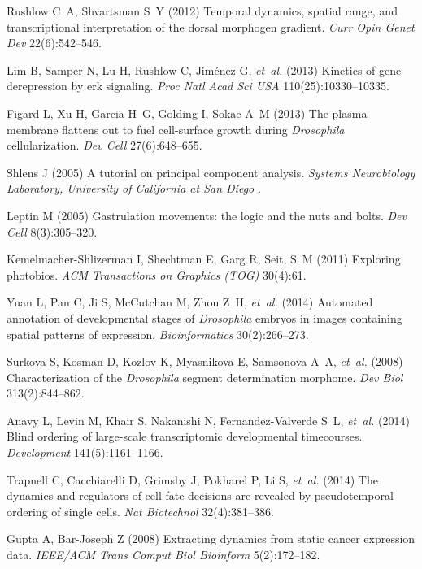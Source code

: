 \documentclass{pnastwo}
\begin{document}
\begin{article}
\begin{thebibliography}{10}
Rushlow C~A, Shvartsman S~Y (2012) Temporal dynamics, spatial range, and
  transcriptional interpretation of the dorsal morphogen gradient.
  \textit{Curr Opin Genet Dev} 22(6):542--546.

Lim B, Samper N, Lu H, Rushlow C, Jim{\'e}nez G, \textit{et~al.} (2013)
  Kinetics of gene derepression by erk signaling. \textit{Proc Natl Acad Sci USA} 110(25):10330--10335.

Figard L, Xu H, Garcia H~G, Golding I, Sokac A~M (2013) The plasma membrane
  flattens out to fuel cell-surface growth during \textit{{D}rosophila}
  cellularization. \textit{Dev Cell} 27(6):648--655.

Shlens J (2005) A tutorial on principal component analysis. \textit{Systems
  Neurobiology Laboratory, University of California at San Diego} .

Leptin M (2005) Gastrulation movements: the logic and the nuts and bolts.
  \textit{Dev Cell} 8(3):305--320.

Kemelmacher-Shlizerman I, Shechtman E, Garg R, Seit, S~M (2011)
Exploring photobios. \textit{ACM Transactions on Graphics (TOG)} 30(4):61.

Yuan L, Pan C, Ji S, McCutchan M, Zhou Z~H, \textit{et~al.} (2014) Automated
  annotation of developmental stages of \textit{{D}rosophila} embryos in images
  containing spatial patterns of expression. \textit{Bioinformatics}
  30(2):266--273.

Surkova S, Kosman D, Kozlov K, Myasnikova E, Samsonova A~A, \textit{et~al.}
  (2008) Characterization of the \textit{{D}rosophila} segment determination
  morphome. \textit{Dev Biol} 313(2):844--862.

Anavy L, Levin M, Khair S, Nakanishi N, Fernandez-Valverde S~L, \textit{et~al.}
  (2014) Blind ordering of large-scale transcriptomic developmental
  timecourses. \textit{Development} 141(5):1161--1166.

Trapnell C, Cacchiarelli D, Grimsby J, Pokharel P, Li S, \textit{et~al.} (2014)
  The dynamics and regulators of cell fate decisions are revealed by
  pseudotemporal ordering of single cells. \textit{Nat Biotechnol} 32(4):381--386.

Gupta A, Bar-Joseph Z (2008) Extracting dynamics from static cancer expression
  data. \textit{IEEE/ACM Trans Comput Biol Bioinform} 5(2):172--182.


\end{thebibliography}
\end{article}
\end{document}
